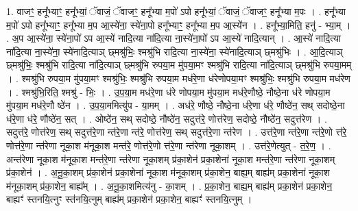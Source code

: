 \documentclass[17pt]{extarticle}
\begin{document}
1. वाजꣳ॒॒ हनू᳚भ्याꣳ॒॒ हनू᳚भ्यां॒ ॅवाजं॒ ॅवाजꣳ॒॒ हनू᳚भ्या म॒पो॑ ऽपो हनू᳚भ्यां॒ ॅवाजं॒ ॅवाजꣳ॒॒ हनू᳚भ्या म॒पः । . हनू᳚भ्या म॒पो॑ ऽपो हनू᳚भ्याꣳ॒॒ हनू᳚भ्या म॒प आ॒स्ये॑ना॒ स्ये॑ना॒पो हनू᳚भ्याꣳ॒॒ हनू᳚भ्या म॒प आ॒स्ये॑न । . हनू᳚भ्या॒मिति॒ हनु॑ - भ्या॒म् । . अ॒प आ॒स्ये॑ना॒ स्ये॑ना॒पो॑ ऽप आ॒स्ये॑ नादि॒त्या ना॑दि॒त्या ना॒स्ये॑ना॒पो॑ ऽप आ॒स्ये॑ नादि॒त्यान् । . आ॒स्ये॑ नादि॒त्या ना॑दि॒त्या ना॒स्ये॑ना॒ स्ये॑नादि॒त्याञ् छ्मश्रु॑भिः॒ श्मश्रु॑भि रादि॒त्या ना॒स्ये॑ना॒ स्ये॑नादि॒त्याञ् छ्मश्रु॑भिः । . आ॒दि॒त्याञ् छ्मश्रु॑भिः॒ श्मश्रु॑भि रादि॒त्या ना॑दि॒त्याञ् छ्मश्रु॑भि रुपया॒म मु॑पया॒मꣳ श्मश्रु॑भि रादि॒त्या ना॑दि॒त्याञ् छ्मश्रु॑भि रुपया॒मम् । . श्मश्रु॑भि रुपया॒म मु॑पया॒मꣳ श्मश्रु॑भिः॒ श्मश्रु॑भि रुपया॒म मध॑रे॒णा ध॑रेणोपया॒मꣳ श्मश्रु॑भिः॒ श्मश्रु॑भि रुपया॒म मध॑रेण । . श्मश्रु॑भि॒रिति॒ श्मश्रु॑ - भिः॒ । . उ॒प॒या॒म मध॑रे॒णा ध॑रे णोपया॒म मु॑पया॒म मध॑रे॒णौष्ठे॒ नौष्ठे॒ना ध॑रे णोपया॒म मु॑पया॒म मध॑रे॒णौ ष्ठे॑न । . उ॒प॒या॒ममित्यु॑प - या॒मम् । . अध॑रे॒ णौष्ठे॒ नौष्ठे॒ना ध॑रे॒णा ध॑रे॒ णौष्ठे॑न॒ सथ् सदोष्ठे॒ना ध॑रे॒णा ध॑रे॒
णौष्ठे॑न॒ सत् । . ओष्ठे॑न॒ सथ् सदोष्ठे॒ नौष्ठे॑न॒ सदुत्त॑रे॒ णोत्त॑रेण॒ सदोष्ठे॒ नौष्ठे॑न॒ सदुत्त॑रेण । . सदुत्त॑रे॒ णोत्त॑रेण॒ सथ् सदुत्त॑रे॒णा न्त॑रे॒णा न्त॑रे॒ णोत्त॑रेण॒ सथ् सदुत्त॑रे॒णा न्त॑रेण । . उत्त॑रे॒णा न्त॑रे॒णा न्त॑रे॒णो त्त॑रे॒ णोत्त॑रे॒णा न्त॑रेणा नूका॒श म॑नूका॒श मन्त॑रे॒ णोत्त॑रे॒णो त्त॑रे॒णा न्त॑रेणा नूका॒शम् । . उत्त॑रे॒णेत्युत् - त॒रे॒ण॒ । . अन्त॑रेणा नूका॒श म॑नूका॒श मन्त॑रे॒णा न्त॑रेणा नूका॒शम् प्र॑का॒शेन॑ प्रका॒शेना॑ नूका॒श मन्त॑रे॒णा न्त॑रेणा नूका॒शम् प्र॑का॒शेन॑ । . अ॒नू॒का॒शम् प्र॑का॒शेन॑ प्रका॒शेना॑ नूका॒श म॑नूका॒शम् प्र॑का॒शेन॒ बाह्य॒म् बाह्य॑म् प्रका॒शेना॑ नूका॒श म॑नूका॒शम् प्र॑का॒शेन॒ बाह्य᳚म् । . अ॒नू॒का॒शमित्य॑नु - का॒शम् । . प्र॒का॒शेन॒ बाह्य॒म् बाह्य॑म् प्रका॒शेन॑ प्रका॒शेन॒ बाह्यꣳ॑ स्तनयि॒त्नुꣳ स्त॑नयि॒त्नुम् बाह्य॑म् प्रका॒शेन॑ प्रका॒शेन॒ बाह्यꣳ॑ स्तनयि॒त्नुम् । \newline
\end{document}
